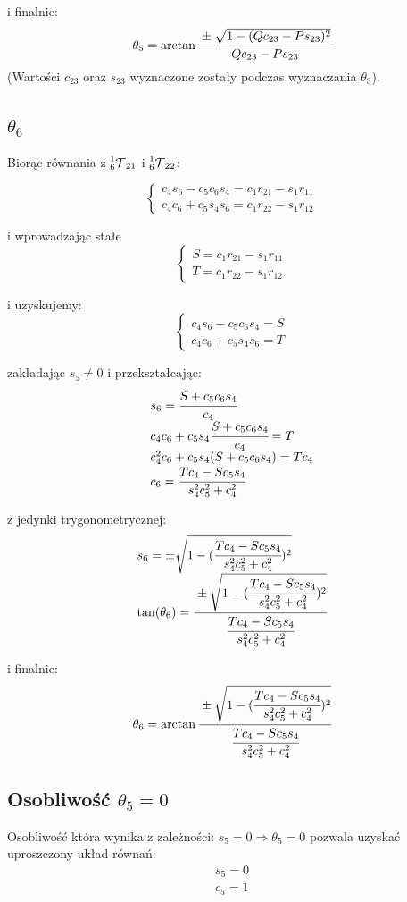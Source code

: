 \documentclass[]{article}
\newcommand\T{\mathcal{T}}
\begin{document}
i finalnie:
\[
\theta_5 = \arctan\cfrac{\pm \sqrt{1 - (Qc_{23} - Ps_{23})^2}}{Qc_{23} - Ps_{23}}
\]
(Wartości $c_{23}$ oraz $s_{23}$ wyznaczone zostały podczas wyznaczania $\theta_3$).

\subsection{$\theta_6$}
Biorąc równania z $\prescript{1}{6}{\T}_{21}$ i $\prescript{1}{6}{\T}_{22}$:

\[\left\{\begin{array}{l}
c_4s_6 - c_5c_6s_4 = c_1r_{21} - s_1r_{11} \\
c_4c_6 + c_5s_4s_6 = c_1r_{22} - s_1r_{12}
\end{array}\right.\]

i wprowadzając stałe
\[\left\{\begin{array}{l}
S = c_1r_{21} - s_1r_{11} \\
T = c_1r_{22} - s_1r_{12}
\end{array}\right.\]

i uzyskujemy:
\[\left\{\begin{array}{l}
c_4s_6 - c_5c_6s_4 = S \\
c_4c_6 + c_5s_4s_6 = T
\end{array}\right.\]

zakładając $s_5 \neq 0$ i przekształcając:
\[\begin{array}{l}
s_6 = \cfrac{S + c_5c_6s_4}{c_4} \\
c_4c_6 + c_5s_4\cfrac{S + c_5c_6s_4}{c_4} = T \\
c_4^2c_6 + c_5s_4(S + c_5c_6s_4) = Tc_4 \\
c_6 = \cfrac{Tc_4 - Sc_5s_4}{s_4^2c_5^2 + c_4^2}
\end{array}\]

z jedynki trygonometrycznej:
\[\begin{array}{l}
s_6 = \pm \sqrt{1 - (\cfrac{Tc_4 - Sc_5s_4}{s_4^2c_5^2 + c_4^2})^2} \\
\tan(\theta_6) = \cfrac{\pm \sqrt{1 - (\cfrac{Tc_4 - Sc_5s_4}{s_4^2c_5^2 + c_4^2})^2}}{\cfrac{Tc_4 - Sc_5s_4}{s_4^2c_5^2 + c_4^2}}
\end{array}\]

i finalnie:
\[
\theta_6 = \arctan\cfrac{\pm \sqrt{1 - (\cfrac{Tc_4 - Sc_5s_4}{s_4^2c_5^2 + c_4^2})^2}}{\cfrac{Tc_4 - Sc_5s_4}{s_4^2c_5^2 + c_4^2}}
\]

\subsection{Osobliwość $\theta_5 = 0$}
Osobliwość która wynika z zależności:  $s_5 = 0 \Rightarrow \theta_5 = 0$ pozwala uzyskać uproszczony układ równań:
\[\begin{array}{l}
s_5 = 0 \\
c_5 = 1
\end{array}\]
\end{document}
